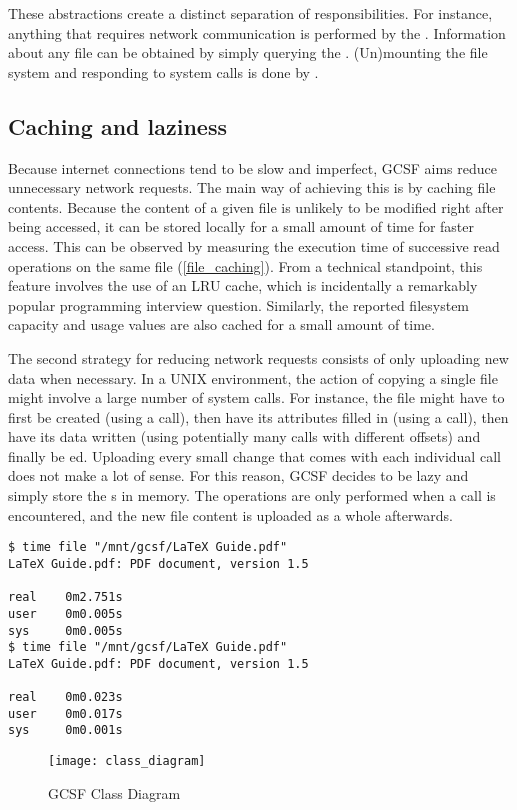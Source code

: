 These abstractions create a distinct separation of responsibilities. For instance, anything that requires network communication is performed by the . Information about any file can be obtained by simply querying the . (Un)mounting the file system and responding to system calls is done by .

\subsection{Caching and laziness}

Because internet connections tend to be slow and imperfect, GCSF aims reduce unnecessary network requests. The main way of achieving this is by caching file contents. Because the content of a given file is unlikely to be modified right after being accessed, it can be stored locally for a small amount of time for faster access. This can be observed by measuring the execution time of successive read operations on the same file (\ref{file_caching}). From a technical standpoint, this feature involves the use of an LRU cache, which is incidentally a remarkably popular programming interview question. Similarly, the reported filesystem capacity and usage values are also cached for a small amount of time.

The second strategy for reducing network requests consists of only uploading new data when necessary. In a UNIX environment, the action of copying a single file might involve a large number of system calls. For instance, the file might have to first be created (using a  call), then have its attributes filled in (using a  call), then have its data written (using potentially many  calls with different offsets) and finally be ed. Uploading every small change that comes with each individual  call does not make a lot of sense. For this reason, GCSF decides to be lazy and simply store the s in memory. The operations are only performed when a  call is encountered, and the new file content is uploaded as a whole afterwards.


\begin{lstlisting}[caption=File caching, frame=single, label=file_caching]
$ time file "/mnt/gcsf/LaTeX Guide.pdf"
LaTeX Guide.pdf: PDF document, version 1.5

real    0m2.751s
user    0m0.005s
sys     0m0.005s
$ time file "/mnt/gcsf/LaTeX Guide.pdf"
LaTeX Guide.pdf: PDF document, version 1.5

real    0m0.023s
user    0m0.017s
sys     0m0.001s
\end{lstlisting}


\begin{figure}[bpt]
\caption{GCSF Class Diagram}
\label{fig:gcsf_class_diagram}
\centering
\texttt{[image: class\_diagram]}
\end{figure}
